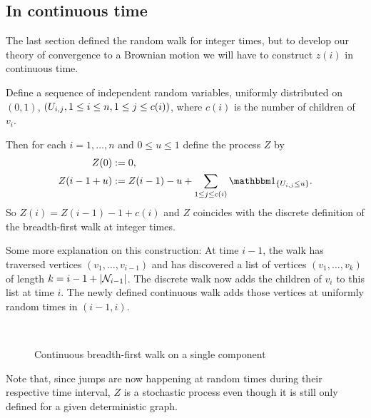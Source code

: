 \subsection{In continuous time}

The last section defined the random walk for integer times,
but to develop our theory of convergence to a Brownian motion
we will have to construct $z(i)$ in continuous time.

Define a sequence of independent random variables, 
uniformly distributed on $(0,1)$, 
$(U_{i,j}, 1 \leq i \leq n, 1 \leq j \leq c(i))$,
where $c(i)$ is the number of children of $v_i$.

Then for each $i = 1, \dots, n$ and $0 \leq u \leq 1$ define the process $Z$ by
\begin{equation} \label{E: def Z}
\begin{aligned}
Z(0) &:= 0, \\
Z(i - 1 + u) &:= Z(i-1) - u + \sum_{1 \leq j \leq c(i)} \Ind{\{ \Uij \leq u \}}.
\end{aligned}
\end{equation}
So $Z(i) = Z(i-1) - 1 + c(i)$ and $Z$ coincides with the discrete definition of the breadth-first walk at integer times.

Some more explanation on this construction:
At time $i-1$, 
the walk has traversed vertices
$(v_1, \dots, v_{i-1})$
and has discovered a list of vertices
$(v_1, \dots, v_k)$
of length
$k = i-1 + |\mathcal{N}_{i-1}|$.
The discrete walk now adds the children of $v_i$ to this list at time $i$.
The newly defined continuous walk adds those vertices at uniformly random times in $(i-1, i)$.

\begin{figure}[H]
	
	\centering
	\\
	
	\centering
	
	\caption{Continuous breadth-first walk on a single component}
	\label{F: bf-walk cont}
\end{figure} 

Note that, 
since jumps are now happening at random times during their respective time interval, 
$Z$ is a stochastic process even though it is still only defined for a given deterministic graph.


